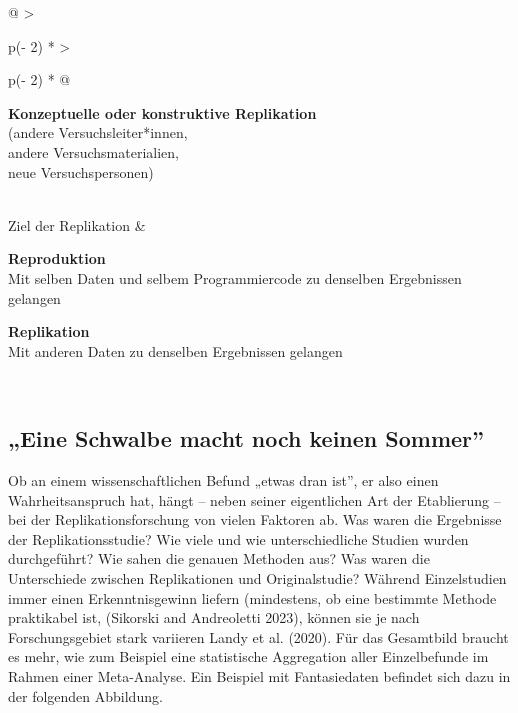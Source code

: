 \documentclass[
  letterpaper,
  DIV=11,
  numbers=noendperiod]{scrreprt}
\begin{document}
\begin{longtable}[]{@{}
  >{\raggedright\arraybackslash}p{(\columnwidth - 2\tabcolsep) * }
  >{\raggedright\arraybackslash}p{(\columnwidth - 2\tabcolsep) * }@{}}
\begin{minipage}[t]{\linewidth}
\textbf{Konzeptuelle oder konstruktive Replikation}\\
(andere Versuchsleiter*innen,\\
andere Versuchsmaterialien,\\
neue Versuchspersonen)\strut
\end{minipage} \\
Ziel der Replikation & \begin{minipage}[t]{\linewidth}\raggedright
\textbf{Reproduktion}\\
Mit selben Daten und selbem Programmiercode zu denselben Ergebnissen
gelangen

\textbf{Replikation}\\
Mit anderen Daten zu denselben Ergebnissen gelangen\strut
\end{minipage} \\
\end{longtable}

\subsection{„Eine Schwalbe macht noch keinen
Sommer''}\label{eine-schwalbe-macht-noch-keinen-sommer}

Ob an einem wissenschaftlichen Befund „etwas dran ist'', er also einen
Wahrheitsanspruch hat, hängt -- neben seiner eigentlichen Art der
Etablierung -- bei der Replikationsforschung von vielen Faktoren ab. Was
waren die Ergebnisse der Replikationsstudie? Wie viele und wie
unterschiedliche Studien wurden durchgeführt? Wie sahen die genauen
Methoden aus? Was waren die Unterschiede zwischen Replikationen und
Originalstudie? Während Einzelstudien immer einen Erkenntnisgewinn
liefern (mindestens, ob eine bestimmte Methode praktikabel ist,
(Sikorski and Andreoletti 2023), können sie je nach Forschungsgebiet
stark variieren Landy et al. (2020). Für das Gesamtbild braucht es mehr,
wie zum Beispiel eine statistische Aggregation aller Einzelbefunde im
Rahmen einer Meta-Analyse. Ein Beispiel mit Fantasiedaten befindet sich
dazu in der folgenden Abbildung.
\end{document}
